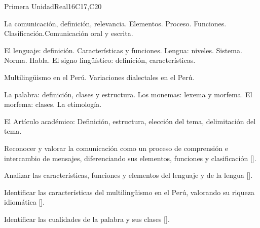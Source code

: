 \begin{syllabus}
\begin{unit}{Primera Unidad}{}{Real}{16}{C17,C20}
\begin{topics}
      \item La comunicación, definición, relevancia. Elementos. Proceso. Funciones. Clasificación.Comunicación oral y escrita.
      \item El lenguaje: definición. Características y funciones. Lengua: niveles. Sistema. Norma. Habla. El signo lingüístico: definición, características.
      \item Multilingüismo en el Perú. Variaciones dialectales en el Perú.
      \item La palabra: definición, clases y estructura. Los monemas: lexema y morfema. El morfema: clases. La etimología.
      \item El Artículo académico: Definición, estructura, elección del tema, delimitación del tema.
\end{topics}

\begin{learningoutcomes}
   \item Reconocer y valorar la comunicación como un proceso de comprensión e intercambio de mensajes, diferenciando sus elementos, funciones y clasificación [\Usage].
   \item Analizar las características, funciones y elementos del lenguaje y de la lengua [\Usage].
   \item Identificar las características del multilingüismo en el Perú, valorando su riqueza idiomática [\Usage].
   \item Identificar las cualidades de la palabra y sus clases [\Usage].
\end{learningoutcomes}
\end{unit}

\begin{coursebibliography}
\end{coursebibliography}

\end{syllabus}
